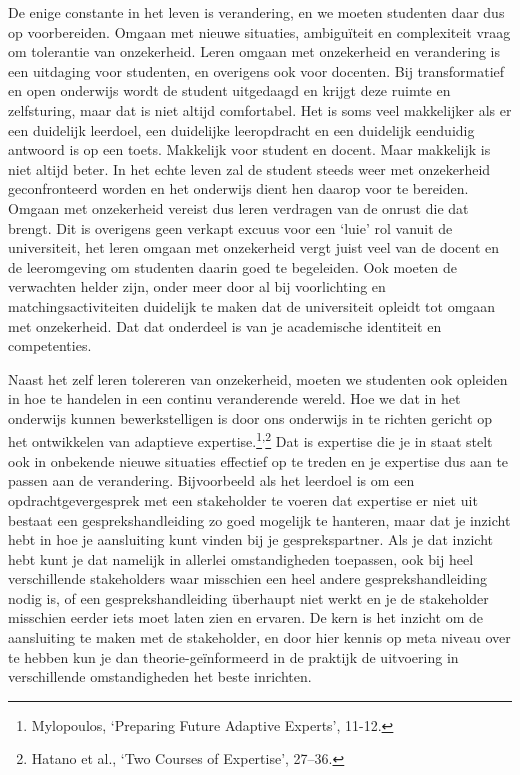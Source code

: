 \documentclass[smallauthor, chapterhaspagenum, nochapterinheader, pagenuminheader,  bigchapnum,medium2, tocpages, garamond, titleinheader]{jote-book}
\begin{document}
	De enige constante in het leven is verandering, en we moeten studenten daar dus op voorbereiden. Omgaan met nieuwe situaties, ambiguïteit en complexiteit vraag om tolerantie van onzekerheid. Leren omgaan met onzekerheid en verandering is een uitdaging voor studenten, en overigens ook voor docenten. Bij transformatief en open onderwijs wordt de student uitgedaagd en krijgt deze ruimte en zelfsturing, maar dat is niet altijd comfortabel. Het is soms veel makkelijker als er een duidelijk leerdoel, een duidelijke leeropdracht en een duidelijk eenduidig antwoord is op een toets. Makkelijk voor student en docent. Maar makkelijk is niet altijd beter. In het echte leven zal de student steeds weer met onzekerheid geconfronteerd worden en het onderwijs dient hen daarop voor te bereiden. Omgaan met onzekerheid vereist dus leren verdragen van de onrust die dat brengt. Dit is overigens geen verkapt excuus voor een ‘luie' rol vanuit de universiteit, het leren omgaan met onzekerheid vergt juist veel van de docent en de leeromgeving om studenten daarin goed te begeleiden. Ook moeten de verwachten helder zijn, onder meer door al bij voorlichting en matchingsactiviteiten duidelijk te maken dat de universiteit opleidt tot omgaan met onzekerheid. Dat dat onderdeel is van je academische identiteit en competenties.



	Naast het zelf leren tolereren van onzekerheid, moeten we studenten ook opleiden in hoe te handelen in een continu veranderende wereld. Hoe we dat in het onderwijs kunnen bewerkstelligen is door ons onderwijs in te richten gericht op het ontwikkelen van adaptieve expertise.\footnote{Mylopoulos, ‘Preparing Future Adaptive Experts', 11-12.}\textsuperscript{,}\footnote{Hatano et al., ‘Two Courses of Expertise', 27--36.} Dat is expertise die je in staat stelt ook in onbekende nieuwe situaties effectief op te treden en je expertise dus aan te passen aan de verandering. Bijvoorbeeld als het leerdoel is om een opdrachtgevergesprek met een stakeholder te voeren dat expertise er niet uit bestaat een gesprekshandleiding zo goed mogelijk te hanteren, maar dat je inzicht hebt in hoe je aansluiting kunt vinden bij je gesprekspartner. Als je dat inzicht hebt kunt je dat namelijk in allerlei omstandigheden toepassen, ook bij heel verschillende stakeholders waar misschien een heel andere gesprekshandleiding nodig is, of een gesprekshandleiding überhaupt niet werkt en je de stakeholder misschien eerder iets moet laten zien en ervaren. De kern is het inzicht om de aansluiting te maken met de stakeholder, en door hier kennis op meta niveau over te hebben kun je dan theorie-geïnformeerd in de praktijk de uitvoering in verschillende omstandigheden het beste inrichten.
\end{document}
